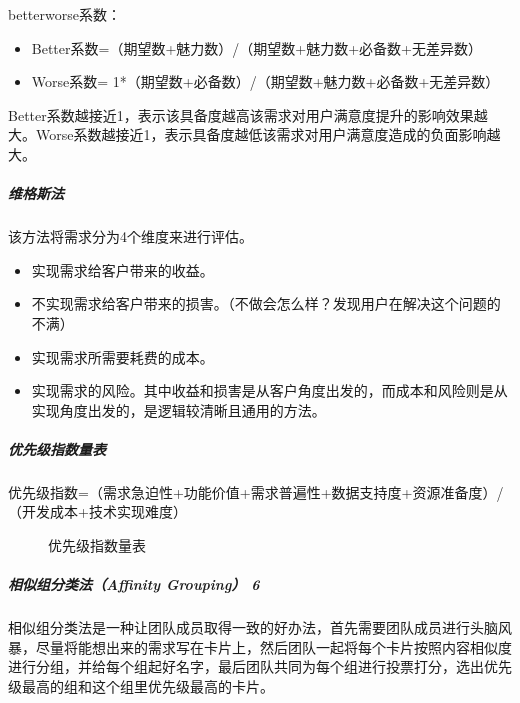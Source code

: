 \documentclass[letterpaper,10pt,english]{sphinxmanual}
\begin{document}
better\sphinxhyphen{}worse系数：
\begin{itemize}
\item {} 
Better系数=（期望数+魅力数）/（期望数+魅力数+必备数+无差异数）

\item {} 
Worse系数= \sphinxhyphen{}1*（期望数+必备数）/（期望数+魅力数+必备数+无差异数）

\end{itemize}

Better系数越接近1，表示该具备度越高该需求对用户满意度提升的影响效果越大。Worse系数越接近\sphinxhyphen{}1，表示具备度越低该需求对用户满意度造成的负面影响越大。



\subparagraph{维格斯法}
\label{\detokenize{chapter_knowledge/upgrade_manage:id18}}
该方法将需求分为4个维度来进行评估。
\begin{itemize}
\item {} 
实现需求给客户带来的收益。

\item {} 
不实现需求给客户带来的损害。（不做会怎么样？发现用户在解决这个问题的不满）

\item {} 
实现需求所需要耗费的成本。

\item {} 
实现需求的风险。其中收益和损害是从客户角度出发的，而成本和风险则是从实现角度出发的，是逻辑较清晰且通用的方法。

\end{itemize}


\subparagraph{优先级指数量表}
\label{\detokenize{chapter_knowledge/upgrade_manage:id19}}
优先级指数=（需求急迫性+功能价值+需求普遍性+数据支持度+资源准备度）/（开发成本+技术实现难度）

\begin{figure}[H]
\centering
\capstart

\noindent{}
\caption{优先级指数量表}\label{\detokenize{chapter_knowledge/upgrade_manage:id25}}\end{figure}


\subparagraph{相似组分类法（Affinity Grouping） 6\sphinxfootnotemark[678]}
\label{\detokenize{chapter_knowledge/upgrade_manage:affinity-grouping-6}}%
\begin{footnotetext}[678]\sphinxAtStartFootnote
{}
%
\end{footnotetext}\ignorespaces 
相似组分类法是一种让团队成员取得一致的好办法，首先需要团队成员进行头脑风暴，尽量将能想出来的需求写在卡片上，然后团队一起将每个卡片按照内容相似度进行分组，并给每个组起好名字，最后团队共同为每个组进行投票打分，选出优先级最高的组和这个组里优先级最高的卡片。
\end{document}
